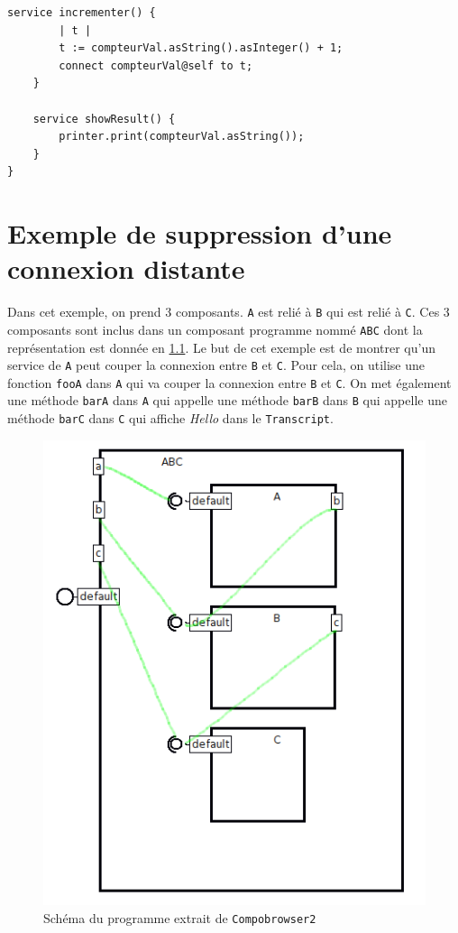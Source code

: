 \documentclass[11pt,a4paper,openany,oneside]{book}
\begin{document}
\begin{appendices}
\begin{lstlisting}[language=Compo, frame=single, caption=Compteur de la Police]
	service incrementer() {
	    | t |
	    t := compteurVal.asString().asInteger() + 1;
	    connect compteurVal@self to t;
	}
	
	service showResult() {
		printer.print(compteurVal.asString());
	}
}
\end{lstlisting}

\chapter{Exemple de suppression d'une connexion distante}


\label{deconnexiondistante}

Dans cet exemple, on prend 3 composants. \texttt{A} est relié à \texttt{B} qui est relié à \texttt{C}. Ces 3 composants sont inclus dans un composant programme nommé \texttt{ABC} dont la représentation est donnée en \ref{abc}. Le but de cet exemple est de montrer qu'un service de \texttt{A} peut couper la connexion entre \texttt{B} et \texttt{C}. Pour cela, on utilise une fonction \texttt{fooA} dans \texttt{A} qui va couper la connexion entre \texttt{B} et \texttt{C}. On met également une méthode \texttt{barA} dans \texttt{A} qui appelle une méthode \texttt{barB} dans \texttt{B} qui appelle une méthode \texttt{barC} dans \texttt{C} qui affiche \textit{Hello} dans le \texttt{Transcript}.

\begin{figure}[H]
\centering
\includegraphics[scale=0.55, keepaspectratio=true]{abc}
\caption{Schéma du programme extrait de \texttt{Compobrowser2}}
\label{abc}
\end{figure}


\end{appendices}
\end{document}
